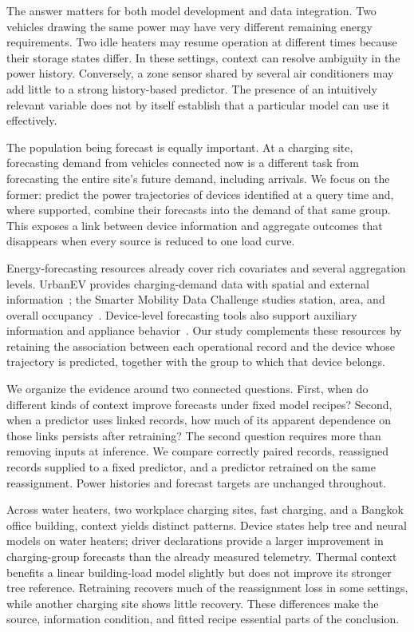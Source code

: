 \documentclass[conference,a4paper]{IEEEtran}
\begin{document}
The answer matters for both model development and data integration. Two
vehicles drawing the same power may have very different remaining energy
requirements. Two idle heaters may resume operation at different times
because their storage states differ. In these settings, context can resolve
ambiguity in the power history. Conversely, a zone sensor shared by several
air conditioners may add little to a strong history-based predictor. The
presence of an intuitively relevant variable does not by itself establish
that a particular model can use it effectively.

The population being forecast is equally important. At a charging site,
forecasting demand from vehicles connected now is a different task from
forecasting the entire site's future demand, including arrivals. We focus
on the former: predict the power trajectories of devices identified at a
query time and, where supported, combine their forecasts into the demand of
that same group. This exposes a link between device information and aggregate
outcomes that disappears when every source is reduced to one load curve.

Energy-forecasting resources already cover rich covariates and several
aggregation levels. UrbanEV provides charging-demand data with spatial and
external information~\cite{li2025urbanev}; the Smarter Mobility Data Challenge
studies station, area, and overall occupancy~\cite{amaraouali2024occupancy}.
Device-level forecasting tools also support auxiliary information and
appliance behavior~\cite{neupane2016demand}. Our study complements these
resources by retaining the association between each operational record and
the device whose trajectory is predicted, together with the group to which
that device belongs.

We organize the evidence around two connected questions. First, when do
different kinds of context improve forecasts under fixed model recipes?
Second, when a predictor uses linked records, how much of its apparent
dependence on those links persists after retraining? The second question
requires more than removing inputs at inference. We compare correctly paired
records, reassigned records supplied to a fixed predictor, and a predictor
retrained on the same reassignment. Power histories and forecast targets are
unchanged throughout.

Across water heaters, two workplace charging sites, fast charging, and a
Bangkok office building, context yields distinct patterns. Device states help
tree and neural models on water heaters; driver declarations provide a
larger improvement in charging-group forecasts than the already measured
telemetry. Thermal context benefits a linear building-load model slightly
but does not improve its stronger tree reference. Retraining recovers much
of the reassignment loss in some settings, while another charging site shows
little recovery. These differences make the source, information condition,
and fitted recipe essential parts of the conclusion.
\end{document}
